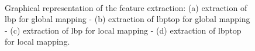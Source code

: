 \begin{figure}[t]
  \centering
  \hspace*{\fill}
   \hfill
  \hspace*{\fill}\\
  \hspace*{\fill}
   \hfill
  \hspace*{\fill}
  \caption{Graphical representation of the feature extraction: (a) extraction of \ac{lbp} for global mapping - (b) extraction of \ac{lbptop} for global mapping - (c) extraction of \ac{lbp} for local mapping - (d) extraction of \ac{lbptop} for local mapping.}
  \label{fig:feaextimg}
\end{figure}

